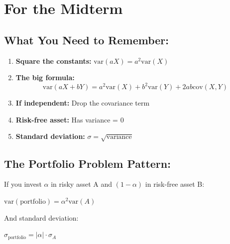 \documentclass[12pt]{article}
\begin{document}
\newpage

\section*{\Large For the Midterm}

\subsection*{What You Need to Remember:}

\begin{enumerate}[leftmargin=2cm, itemsep=1em]
    \item \textbf{Square the constants:} $\text{var}(aX) = a^2\text{var}(X)$

    \item \textbf{The big formula:}
    \[
    \text{var}(aX + bY) = a^2\text{var}(X) + b^2\text{var}(Y) + 2ab\text{cov}(X,Y)
    \]

    \item \textbf{If independent:} Drop the covariance term

    \item \textbf{Risk-free asset:} Has variance = 0

    \item \textbf{Standard deviation:} $\sigma = \sqrt{\text{variance}}$
\end{enumerate}

\vspace{2em}

\subsection*{The Portfolio Problem Pattern:}

If you invest $\alpha$ in risky asset A and $(1-\alpha)$ in risk-free asset B:

\begin{center}
\colorbox{blue!10}{
\large
$\text{var}(\text{portfolio}) = \alpha^2 \text{var}(A)$
}
\end{center}

\vspace{1em}

And standard deviation:

\begin{center}
\colorbox{blue!10}{
\large
$\sigma_{\text{portfolio}} = |\alpha| \cdot \sigma_A$
}
\end{center}

\newpage
\end{document}
